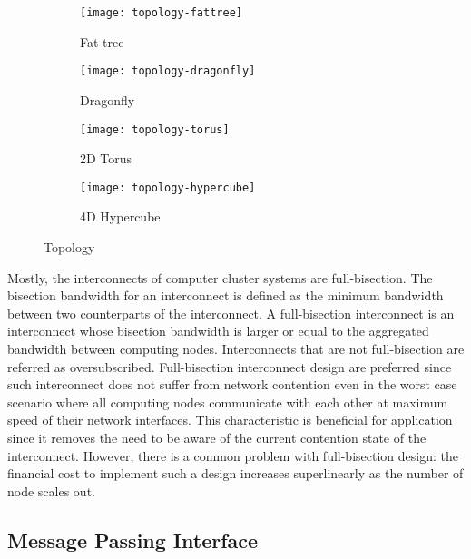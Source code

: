 \begin{figure}
    \centering
    \begin{subfigure}{.45\linewidth}
        \centering
        \texttt{[image: topology-fattree]}
        \caption{Fat-tree}%
        \label{fig:topology-fattree}
    \end{subfigure}
    \begin{subfigure}{.45\linewidth}
        \centering
        \texttt{[image: topology-dragonfly]}
        \caption{Dragonfly}%
        \label{fig:topology-dragonfly}
    \end{subfigure}
    \par\bigskip
    \begin{subfigure}{.45\linewidth}
        \centering
        \texttt{[image: topology-torus]}
        \caption{2D Torus}%
        \label{fig:topology-torus}
    \end{subfigure}
    \begin{subfigure}{.45\linewidth}
        \centering
        \texttt{[image: topology-hypercube]}
        \caption{4D Hypercube}%
        \label{fig:topology-hypercube}
    \end{subfigure}
    \caption{Topology}%
    \label{fig:topology}
\end{figure}


Mostly, the interconnects of computer cluster systems are full-bisection.
The bisection bandwidth for an interconnect is defined as the minimum
bandwidth between two counterparts of the interconnect. A full-bisection
interconnect is an interconnect whose bisection bandwidth is larger or equal
to the aggregated bandwidth between computing nodes. Interconnects that are
not full-bisection are referred as oversubscribed. Full-bisection interconnect
design are preferred since such interconnect does not suffer from network
contention even in the worst case scenario where all computing nodes
communicate with each other at maximum speed of their network interfaces. This
characteristic is beneficial for application since it removes the need to be
aware of the current contention state of the interconnect. However, there is a
common problem with full-bisection design: the financial cost to implement
such a design increases superlinearly as the number of node scales out.

\subsection{Message Passing Interface}\label{sec:i-mpi}


